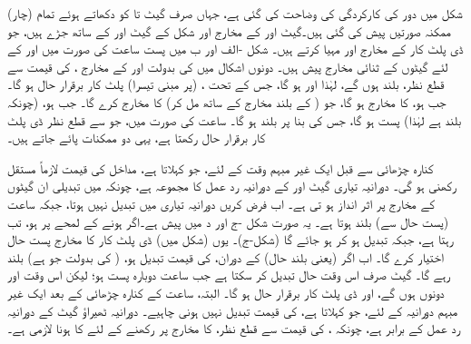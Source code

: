 شکل  میں دور کی کارکردگی کی وضاحت کی گئی ہے، جہاں صرف  گیٹ  تا  کو دکھاتے ہوئے تمام (چار) ممکنہ صورتیں پیش کی گئی ہیں۔گیٹ  اور  کے مخارج  اور  شکل    کے  گیٹ  اور  کے ساتھ جڑے ہیں، جو ڈی پلٹ کار کے مخارج  اور  مہیا کرتے ہیں۔ شکل   -الف اور ب میں پست ساعت  کی صورت میں  اور  کے لئے   گیٹوں کے ثنائی   مخارج  پیش ہیں۔ دونوں اشکال میں   کی بدولت    اور  کے مخارج ،  کی قیمت   سے قطع نظر، بلند ہوں گے، لہٰذا  اور  ہو گا، جس کے تحت  ، (پر مبنی تیسرا)  پلٹ کار برقرار حال ہو گا۔ جب  ہو،  کا مخارج   ہو گا، جو  ( کے بلند مخارج کے ساتھ مل کر)  کا مخارج    کرے گا۔ جب  ہو،  (چونکہ  بلند ہے لہٰذا) پست  ہو گا، جس کی بنا پر  بلند  ہو گا۔ ساعت  کی صورت میں، جو  سے قطع نظر  ڈی پلٹ کار  برقرار حال رکھتا ہے،   یہی دو ممکنات پائے جاتے  ہیں۔


کنارہ چڑھائی سے قبل ایک  غیر مبہم  وقت  کے لئے، جو   کہلاتا ہے،  مداخل   کی قیمت  لازماً  مستقل  رکھنی ہو گی۔ دورانیہ تیاری  گیٹ  اور  کے دورانیہ رد عمل کا مجموعہ ہے، چونکہ  میں تبدیلی ان گیٹوں کے مخارج پر اثر انداز ہو تی ہے۔  اب فرض  کریں دورانیہ تیاری   میں   تبدیل نہیں ہوتا، جبکہ  ساعت  (پست حال سے)   بلند   ہوتا ہے۔ یہ صورت   شکل -ج اور د میں پیش ہے۔اگر  ہونے کے لمحے پر  ہو، تب  رہتا ہے، جبکہ  تبدیل ہو کر  ہو جائے گا   (شکل-ج)۔ یوں (شکل  میں)   ڈی پلٹ کار  کا مخارج   پست  حال اختیار کرے گا۔ اب اگر  (یعنی بلند حال)  کے دوران،     کی قیمت تبدیل ہو، ( کی بدولت جو  ہے)    بلند   رہے گا۔   گیٹ  صرف اس  وقت  حال تبدیل کر سکتا ہے جب ساعت دوبارہ پست   ہو؛ لیکن اس وقت   اور  دونوں  ہوں گے، اور ڈی پلٹ کار برقرار حال  ہو گا۔ البتہ،  ساعت کے کنارہ چڑھائی کے بعد ایک غیر مبہم دورانیہ کے لئے، جو    کہلاتا ہے،  کی قیمت   تبدیل نہیں ہونی چاہیے۔ دورانیہ ٹھیراؤ  گیٹ  کے دورانیہ رد عمل کے برابر ہے، چونکہ ،  کی قیمت سے قطع نظر،  کا مخارج  پر رکھنے کے لئے  کا  ہونا لازمی ہے۔
 
